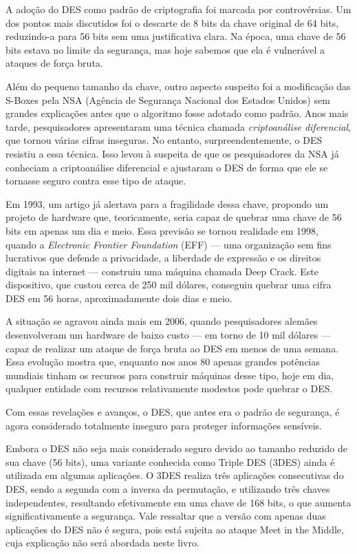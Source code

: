 A adoção do DES como padrão de criptografia foi marcada por controvérsias.
Um dos pontos mais discutidos foi o descarte de 8 bits da chave original de 64 bits, reduzindo-a para 56 bits sem uma justificativa clara.
Na época, uma chave de 56 bits estava no limite da segurança, mas hoje sabemos que ela é vulnerável a ataques de força bruta.

Além do pequeno tamanho da chave, outro aspecto suspeito foi a modificação das S-Boxes pela NSA (Agência de Segurança Nacional dos Estados Unidos) sem grandes explicações antes que o algoritmo fosse adotado como padrão.
Anos mais tarde, pesquisadores apresentaram uma técnica chamada {\em criptoanálise diferencial}, que tornou várias cifras inseguras.
No entanto, surpreendentemente, o DES resistiu a essa técnica.
Isso levou à suspeita de que os pesquisadores da NSA já conheciam a criptoanálise diferencial e ajustaram o DES de forma que ele se tornasse seguro contra esse tipo de ataque.

Em 1993, um artigo já alertava para a fragilidade dessa chave, propondo um projeto de hardware que, teoricamente, seria capaz de quebrar uma chave de 56 bits em apenas um dia e meio.
Essa previsão se tornou realidade em 1998, quando a {\em Electronic Frontier Foundation} (EFF)  — uma organização sem fins lucrativos que defende a privacidade, a liberdade de expressão e os direitos digitais na internet — construiu uma máquina chamada Deep Crack.
Este dispositivo, que custou cerca de 250 mil dólares, conseguiu quebrar uma cifra DES em 56 horas, aproximadamente dois dias e meio.

A situação se agravou ainda mais em 2006, quando pesquisadores alemães desenvolveram um hardware de baixo custo — em torno de 10 mil dólares — capaz de realizar um ataque de força bruta ao DES em menos de uma semana.
Essa evolução mostra que, enquanto nos anos 80 apenas grandes potências mundiais tinham os recursos para construir máquinas desse tipo, hoje em dia, qualquer entidade com recursos relativamente modestos pode quebrar o DES.

Com essas revelações e avanços, o DES, que antes era o padrão de segurança, é agora considerado totalmente inseguro para proteger informações sensíveis.

Embora o DES não seja mais considerado seguro devido ao tamanho reduzido de sua chave (56 bits), uma variante conhecida como Triple DES (3DES) ainda é utilizada em algumas aplicações.
O 3DES realiza três aplicações consecutivas do DES, sendo a segunda com a inversa da permutação, e utilizando três chaves independentes, resultando efetivamente em uma chave de 168 bits, o que aumenta significativamente a segurança.
Vale ressaltar que a versão com apenas duas aplicações do DES não é segura, pois está sujeita ao ataque Meet in the Middle, cuja explicação não será abordada neste livro.

